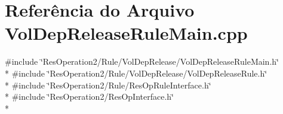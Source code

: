\section{Referência do Arquivo Vol\+Dep\+Release\+Rule\+Main.\+cpp}
\label{_2_rule_2_vol_dep_release_2_vol_dep_release_rule_main_8cpp}
{\ttfamily \#include \char`\"{}Res\+Operation2/\+Rule/\+Vol\+Dep\+Release/\+Vol\+Dep\+Release\+Rule\+Main.\+h\char`\"{}}\\*
{\ttfamily \#include \char`\"{}Res\+Operation2/\+Rule/\+Vol\+Dep\+Release/\+Vol\+Dep\+Release\+Rule.\+h\char`\"{}}\\*
{\ttfamily \#include \char`\"{}Res\+Operation2/\+Rule/\+Res\+Op\+Rule\+Interface.\+h\char`\"{}}\\*
{\ttfamily \#include \char`\"{}Res\+Operation2/\+Res\+Op\+Interface.\+h\char`\"{}}\\*
